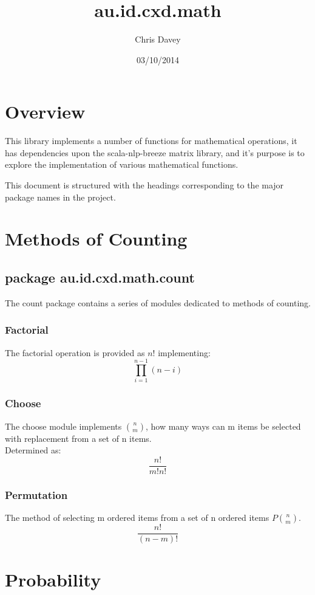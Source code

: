 \documentclass[a4paper]{article}
\title{au.id.cxd.math}
\date{03/10/2014}
\author{Chris Davey}
\begin{document}


\section{Overview}

This library implements a number of functions for mathematical operations, it has dependencies upon the scala-nlp-breeze matrix library, and it's purpose is to explore the implementation of various mathematical functions.

This document is structured with the headings corresponding to the major package names in the project.

\section{Methods of Counting}

\subsection{package au.id.cxd.math.count}

The count package contains a series of modules dedicated to methods of counting.

\subsubsection{Factorial}

The factorial operation is provided as $n!$ implementing:
$$
\prod_{i=1}^{n-1} (n-i)
$$

\subsubsection{Choose}

The choose module implements $n \choose m$, how many ways can m items be selected with replacement from a set of n items. \\
Determined as:
$$
\frac{n!}{m!n!}
$$

\subsubsection{Permutation}

The method of selecting m ordered items from a set of n ordered items $P {n \choose m}$.\\
$$
\frac{n!}{(n-m)!}
$$

\section{Probability}
\end{document}
